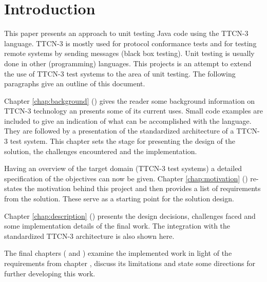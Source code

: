 \chapter{Introduction}

This paper presents an approach to unit testing Java code
using the \ac{TTCN-3} language.
\ac{TTCN-3} is mostly used for protocol conformance tests
and for testing remote systems by sending messages (black box testing).
Unit testing is usually done in other (programming) languages.
This projects is an attempt to extend the use of \ac{TTCN-3} test systems
to the area of unit testing.
The following paragraphs give an outline of this document.

Chapter \ref{chap:background} (\emph{})
gives the reader some background information on \ac{TTCN-3} technology
an presents some of its current uses.
Small code examples are included to give an indication of
what can be accomplished with the language.
They are followed by a presentation of
the standardized architecture of a \ac{TTCN-3} test system.
This chapter sets the stage for presenting
the design of the solution, the challenges encountered and the implementation.

Having an overview of the target domain (\ac{TTCN-3} test systems)
a detailed specification of the objectives can now be given.
Chapter \ref{chap:motivation} (\emph{})
re-states the motivation behind this project
and then provides a list of requirements from the solution.
These serve as a starting point for the solution design.

Chapter \ref{chap:description} (\emph{})
presents the design decisions, challenges faced and some implementation details
of the final work.
The integration with the standardized \ac{TTCN-3} architecture
is also shown here.

The final chapters
(\emph{} and \emph{})
examine the implemented work in light of the requirements from
chapter \emph{},
discuss its limitations
and state some directions for further developing this work.
